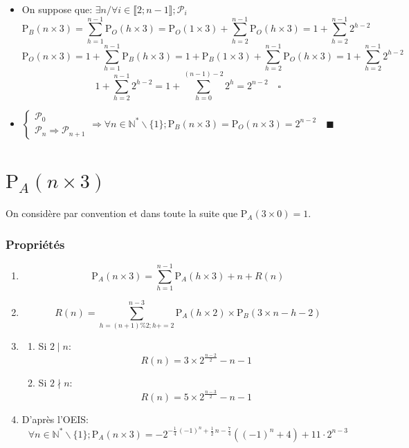 \documentclass[twoside, a4paper, 12pt]{report}
\newcommand{\cqfd}[1][\quad]{\ensuremath{#1\blacksquare}}
\newcommand{\subcqfd}[1][\quad]{\ensuremath{#1\square}}
\newcommand{\pa}[2]{\ensuremath{\text{P}_A\left(#1 \times #2\right)}}
\newcommand{\pb}[2]{\ensuremath{\text{P}_B\left(#1 \times #2\right)}}
\newcommand{\po}[2]{\ensuremath{\text{P}_O\left(#1 \times #2\right)}}
\begin{document}
\begin{enumerate}
\begin{itemize}
\item On suppose que: $\exists n / \forall i \in \llbracket 2; n-1 \rrbracket; \mathcal{P}_i$
\[\pb{n}{3}= \sum_{h=1}^{n-1} \po{h}{3} = \po{1}{3} + \sum_{h=2}^{n-1} \po{h}{3} = 1 + \sum_{h=2}^{n-1} 2^{h-2}\]
\[\po{n}{3} = 1 + \sum_{h=1}^{n-1} \pb{h}{3} = 1 + \pb{1}{3} + \sum_{h=2}^{n-1} \po{h}{3} = 1 + \sum_{h=2}^{n-1} 2^{h-2}\]
\[1 + \sum_{h=2}^{n-1} 2^{h-2} = 1 + \sum_{h=0}^{(n-1) - 2} 2^{h} = 2^{n-2} \subcqfd\]

\item 
$\left\{\begin{array}{ll}
\mathcal{P}_0\\
\mathcal{P}_n \Rightarrow \mathcal{P}_{n+1}
\end{array}\right.
\Rightarrow 
\forall n \in \mathbb{N}^* \backslash \{1\}; \pb{n}{3} = \po{n}{3} = 2^{n-2} \cqfd$
\end{itemize}

\end{enumerate}


\section{\pa{n}{3}}
On considère par convention et dans toute la suite que  $\pa{3}{0} = 1$.
\subsubsection{Propriétés}
\begin{enumerate}
\item \[\pa{n}{3} = \sum_{h=1}^{n-1} \pa{h}{3} + n + R(n) \]
\item \[R(n) = \sum_{h=(n+1)\%2; h += 2}^{n-3} \pa{h}{2} \times \pb{3}{n-h-2}\]
\item
\begin{enumerate}
\item Si $2\mid n$:
\[R(n) = 3 \times 2^{\frac{n-2}{2}} - n - 1\]

\item Si $2\nmid n$:
\[R(n) =  5 \times 2^{\frac{n - 3}{2}}  - n - 1\]
\end{enumerate}

\item D'après l'OEIS\footnotemark:
\[\forall n \in \mathbb{N^*}\backslash \{1\}; \pa{n}{3} = -2^{-\frac{1}{4} \, \left(-1\right)^{n} + \frac{1}{2} \, n - \frac{7}{4}} {\left(\left(-1\right)^{n} + 4\right)} + 11 \cdot 2^{n - 3}\]
\end{enumerate}
\end{document}
